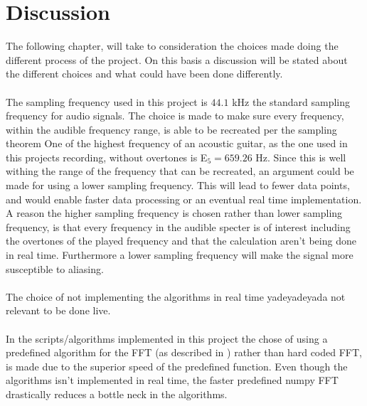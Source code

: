 \chapter{Discussion}
The following chapter, will take to consideration the choices made doing the different process of the project.
On this basis a discussion will be stated about the different choices and what could have been done differently.
\\\\
The sampling frequency used in this project is $44.1$ kHz the standard sampling frequency for audio signals.
The choice is made to make sure every frequency, within the audible frequency range, is able to be recreated per the sampling theorem 
One of the highest frequency of an acoustic guitar, as the one used in this projects recording, without overtones is E$_5 = 659.26$ Hz.
Since this is well withing the range of the frequency that can be recreated, an argument could be made for using a lower sampling frequency.
This will lead to fewer data points, and would enable faster data processing or an eventual real time implementation. 
A reason the higher sampling frequency is chosen rather than lower sampling frequency, is that every frequency in the audible specter is of interest including the overtones of the played frequency and that the calculation aren't being done in real time.
Furthermore a lower sampling frequency will make the signal more susceptible to aliasing. %
\\\\
The choice of not implementing the algorithms in real time yadeyadeyada not relevant to be done live. 
\\\\
In the scripts/algorithms implemented in this project the chose of using  a predefined algorithm for the FFT (as described in ) rather than hard coded FFT, is made due to the superior speed of the predefined function. 
Even though the algorithms isn't implemented in real time, the faster predefined numpy FFT drastically reduces a bottle neck in the algorithms.
\\\\

